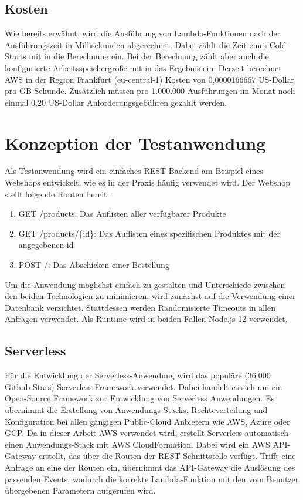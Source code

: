 \subsection{Kosten}
Wie bereits erwähnt, wird die Ausführung von Lambda-Funktionen nach der Ausführungszeit in Millisekunden abgerechnet. Dabei zählt die Zeit eines Cold-Starts mit in die Berechnung ein. Bei der Berechnung zählt aber auch die konfigurierte Arbeitsspeichergröße mit in das Ergebnis ein. Derzeit berechnet AWS in der Region Frankfurt (eu-central-1) Kosten von 0,0000166667 US-Dollar pro GB-Sekunde\cite{noauthor_lambda_nodate}. Zusätzlich müssen pro 1.000.000 Ausführungen im Monat noch einmal 0,20 US-Dollar Anforderungsgebühren gezahlt werden.

\section{Konzeption der Testanwendung}
Als Testanwendung wird ein einfaches REST-Backend am Beispiel eines Webshops entwickelt, wie es in der Praxis häufig verwendet wird. Der Webshop stellt folgende Routen bereit:  

\begin{enumerate}
    \item GET /products: Das Auflisten aller verfügbarer Produkte
    \item GET /products/\{id\}: Das Auflisten eines spezifischen Produktes mit der angegebenen id
    \item POST /: Das Abschicken einer Bestellung
\end{enumerate}

Um die Anwendung möglichst einfach zu gestalten und Unterschiede zwischen den beiden Technologien zu minimieren, wird zunächst auf die Verwendung einer Datenbank verzichtet. Stattdessen werden Randomisierte Timeouts in allen Anfragen verwendet.
Als Runtime wird in beiden Fällen Node.js 12 verwendet.

\subsection{Serverless}
Für die Entwicklung der Serverless-Anwendung wird das populäre (36.000 Github-Stars) Serverless-Framework\cite{noauthor_serverless_nodate} verwendet. Dabei handelt es sich um ein Open-Source Framework zur Entwicklung von Serverless Anwendungen. Es übernimmt die Erstellung von Anwendungs-Stacks, Rechteverteilung und Konfiguration bei allen gängigen Public-Cloud Anbietern wie AWS, Azure oder GCP. Da in dieser Arbeit AWS verwendet wird, erstellt Serverless automatisch einen Anwendungs-Stack mit AWS CloudFormation. Dabei wird ein AWS API-Gateway erstellt, das über die Routen der REST-Schnittstelle verfügt. Trifft eine Anfrage an eine der Routen ein, übernimmt das API-Gateway die Auslösung des passenden Events, wodurch die korrekte Lambda-Funktion mit den vom Benutzer übergebenen Parametern aufgerufen wird. 

